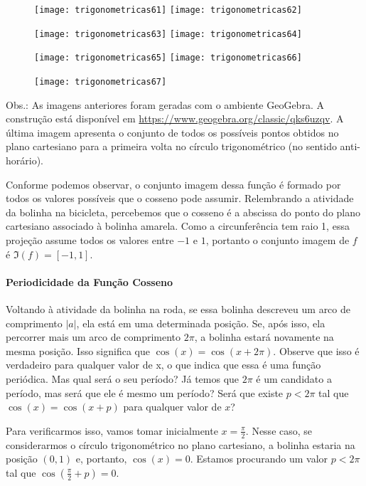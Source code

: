 \begin{figure}[H]
\centering

\texttt{[image: trigonometricas61]}
\texttt{[image: trigonometricas62]}

\texttt{[image: trigonometricas63]}
\texttt{[image: trigonometricas64]}

\texttt{[image: trigonometricas65]}
\texttt{[image: trigonometricas66]}

\end{figure}

\begin{figure}[H]
\centering

\texttt{[image: trigonometricas67]}
\end{figure}

Obs.: As imagens anteriores foram geradas com o ambiente GeoGebra. A construção está disponível em \url{https://www.geogebra.org/classic/qks6uzqv}. A última imagem apresenta o conjunto de todos os possíveis pontos obtidos no plano cartesiano para a primeira volta no círculo trigonométrico (no sentido anti-horário).

Conforme podemos observar, o conjunto imagem dessa função é formado por todos os valores possíveis que o cosseno pode assumir. Relembrando a atividade da bolinha na bicicleta, percebemos que o cosseno é a abscissa do ponto do plano cartesiano associado à bolinha amarela. Como a circunferência tem raio 1, essa projeção assume todos os valores entre $-1$ e $1$, portanto o conjunto imagem de $f$ é $\Im(f)=[-1,1]$.

\paragraph{Periodicidade da Função Cosseno}

Voltando à atividade da bolinha na roda, se essa bolinha descreveu um arco de comprimento $|a|$, ela está em uma determinada posição. Se, após isso, ela percorrer mais um arco de comprimento $2\pi$, a bolinha estará novamente na mesma posição. Isso significa que $\cos(x)=\cos(x+2\pi)$. Observe que isso é verdadeiro para qualquer valor de x, o que indica que essa é uma função periódica. Mas qual será o seu período? Já temos que $2\pi$ é um candidato a período, mas será que ele é mesmo um período? Será que existe $p<2\pi$ tal que $\cos(x)=\cos(x+p)$ para qualquer valor de $x$?

Para verificarmos isso, vamos tomar inicialmente $x=\frac{\pi}{2}$. Nesse caso, se considerarmos o círculo trigonométrico no plano cartesiano, a bolinha estaria na posição $(0,1)$ e, portanto, $\cos(x)=0$. Estamos procurando um valor $p<2\pi$ tal que $\cos(\frac{\pi}{2}+p)=0$.

